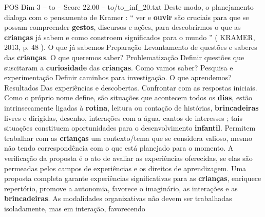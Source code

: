 \begin{textsample}{POS Dim 3 – to – Score 22.00 – to/to\_inf\_20.txt}
Deste modo, o planejamento dialoga com o pensamento de Kramer : “ ver e \textbf{ouvir} são cruciais para que se possam compreender \textbf{gestos}, discursos e ações, para descobrirmos o que as \textbf{crianças} já sabem e como constroem significados para o mundo ” ( KRAMER, 2013, p. 48 ).
O que já sabemos Preparação Levantamento de questões e saberes das \textbf{crianças}.
O que queremos saber?
Problematização Definir questões que suscitaram a \textbf{curiosidade} das \textbf{crianças}.
Como vamos saber?
Pesquisa e experimentação Definir caminhos para investigação.
O que aprendemos?
Resultados Das experiências e descobertas.
Confrontar com as respostas iniciais.
Como o próprio nome define, são situações que acontecem todos os \textbf{dias}, estão intrinsecamente ligadas à \textbf{rotina}, leitura ou contação de histórias, \textbf{brincadeiras} livres e dirigidas, desenho, interações com a água, cantos de interesses ; tais situações constituem oportunidades para o desenvolvimento \textbf{infantil}.
Permitem trabalhar com as \textbf{crianças} um contexto/tema que se considera valioso, mesmo não tendo correspondência com o que está planejado para o momento.
A verificação da proposta é o ato de avaliar as experiências oferecidas, se elas são permeadas pelos campos de experiências e os direitos de aprendizagem.
Uma proposta completa garante experiências significativas para as \textbf{crianças}, enriquece repertório, promove a autonomia, favorece o imaginário, as interações e as \textbf{brincadeiras}.
As modalidades organizativas não devem ser trabalhadas isoladamente, mas em interação, favorecendo

\end{textsample}
